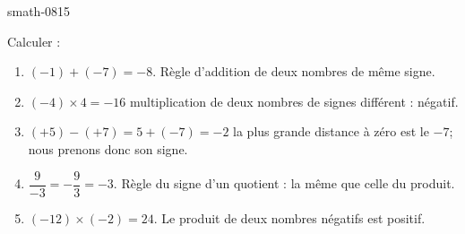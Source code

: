
\begin{corrige}{smath-0815}

    Calculer :
    \begin{enumerate}
        \item
            \( (-1)+(-7)=-8\). Règle d'addition de deux nombres de même signe.
        \item
            \( (-4)\times 4=-16\)  multiplication de deux nombres de signes différent : négatif.
        \item
            \( (+5)-(+7)= 5+(-7) = -2  \)  la plus grande distance à zéro est le \( -7\); nous prenons donc son signe.
        \item
            \( \dfrac{ 9 }{ -3 }=-\dfrac{ 9 }{ 3 }=-3\). Règle du signe d'un quotient : la même que celle du produit.
        \item
            \( (-12)\times (-2)=24\). Le produit de deux nombres négatifs est positif.
    \end{enumerate}

\end{corrige}
